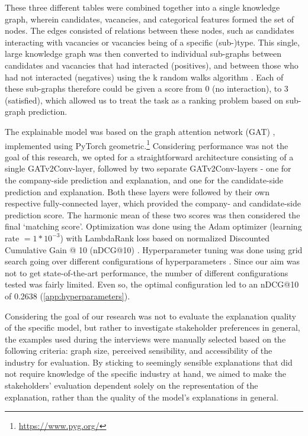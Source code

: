 These three different tables were combined together into a single knowledge graph, wherein candidates, vacancies, and categorical features formed the set of nodes. The edges consisted of relations between these nodes, such as candidates interacting with vacancies or vacancies being of a specific (sub-)type. This single, large knowledge graph was then converted to individual sub-graphs between candidates and vacancies that had interacted (positives), and between those who had not interacted (negatives) using the k random walks algorithm \cite{lovasz1993random}. Each of these sub-graphs therefore could be given a score from 0 (no interaction), to 3 (satisfied), which allowed us to treat the task as a ranking problem based on sub-graph prediction.

The explainable model was based on the graph attention network (GAT) \cite{velivckovic2017graph}, implemented using PyTorch geometric.\footnote{\url{https://www.pyg.org/}} Considering performance was not the goal of this research, we opted for a straightforward architecture consisting of a single GATv2Conv-layer, followed by two separate GATv2Conv-layers - one for the company-side prediction and explanation, and one for the candidate-side prediction and explanation. Both these layers were followed by their own respective fully-connected layer, which provided the company- and candidate-side prediction score. The harmonic mean of these two scores was then considered the final `matching score'. Optimization was done using the Adam optimizer \cite{kingma2014adam} (learning rate $= 1 * 10^{-3}$) with LambdaRank loss based on normalized Discounted Cumulative Gain @ 10 (nDCG@10) \cite{burges2006learning}. Hyperparameter tuning was done using grid search going over different configurations of hyperparameters \cite{liashchynskyi2019grid}. Since our aim was not to get state-of-the-art performance, the number of different configurations tested was fairly limited. Even so, the optimal configuration led to an nDCG@10 of 0.2638 (\cref{app:hyperparameters}).

Considering the goal of our research was not to evaluate the explanation quality of the specific model, but rather to investigate stakeholder preferences in general, the examples used during the interviews were manually selected based on the following criteria: graph size, perceived sensibility, and accessibility of the industry for evaluation. By sticking to seemingly sensible explanations that did not require knowledge of the specific industry at hand, we aimed to make the stakeholders' evaluation dependent solely on the representation of the explanation, rather than the quality of the model's explanations in general. 

